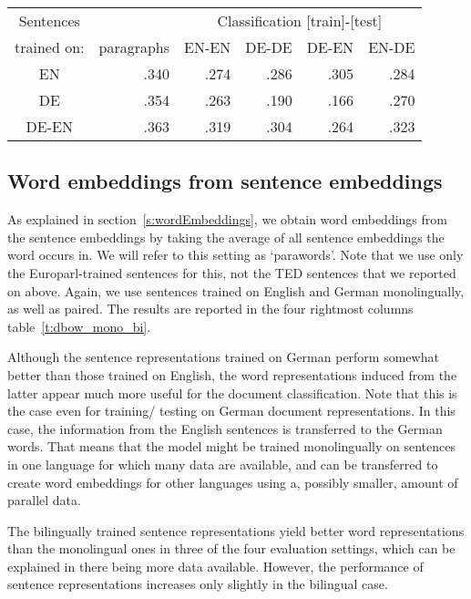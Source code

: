 \begin{table*}[t]
\center
\begin{tabular}{c | r|r r r r }
Sentences 		&		&	\multicolumn{4}{c}{Classification [train]-[test]}	\\
trained on: 		&paragraphs	&EN-EN	&DE-DE	&DE-EN	&EN-DE		\\\hline
EN			&.340		&.274		&.286		&.305		&.284		\\
DE			&.354		&.263		&.190		&.166		&.270		\\
DE-EN			&.363		&.319		&.304		&.264		&.323		\\
\end{tabular}
\caption{F1 scores on TED classification task for sentence representations (paragraphs) and word representations (parawords).}
\label{t:dbow_mono_bi}
\end{table*}



\subsection{Word embeddings from sentence embeddings}

As explained in section~\ref{s:wordEmbeddings}, we obtain word embeddings from the sentence embeddings by taking the average of all sentence embeddings the word occurs in. We will refer to this setting as `parawords'. Note that we use only the Europarl-trained sentences for this, not the TED sentences that we reported on above. Again, we use sentences trained on English and German monolingually, as well as paired. The results are reported in the four rightmost columns table~\ref{t:dbow_mono_bi}.

Although the sentence representations trained on German perform somewhat better than those trained on English, the word representations induced from the latter appear much more useful for the document classification. Note that this is the case even for training/ testing on German document representations. In this case, the information from the English sentences is transferred to the German words. That means that the model might be trained monolingually on sentences in one language for which many data are available, and can be transferred to create word embeddings for other languages using a, possibly smaller, amount of parallel data.

The bilingually trained sentence representations yield better word representations than the monolingual ones in three of the four evaluation settings, which can be explained in there being more data available. However, the performance of sentence representations increases only slightly in the bilingual case.

